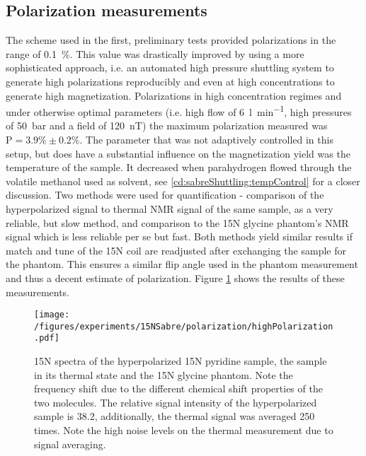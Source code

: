     \subsection{Polarization measurements}
    The scheme used in the first, preliminary tests provided polarizations in the range of \SI{0.1}{\percent}. This value was drastically improved by using a more sophisticated approach, i.e. an automated high pressure shuttling system to generate high polarizations reproducibly and even at high concentrations to generate high magnetization.
    Polarizations in high concentration regimes and under otherwise optimal parameters (i.e. high flow of \SI{6}{\litre\per\minute}, high pressures of \SI{50}{\bar} and a field of \SI{120}{\nano\tesla}) the maximum polarization measured was $\mathrm{P} = 3.9\% \pm 0.2 \%$. The parameter that was not adaptively controlled in this setup, but does have a substantial influence on the magnetization yield was the temperature of the sample.  It decreased when parahydrogen flowed through the volatile methanol used as solvent, see \ref{cd:sabreShuttling:tempControl} for a closer discussion.
    Two methods were used for quantification - comparison of the hyperpolarized signal to thermal NMR signal of the same sample, as a very reliable, but slow method, and comparison to the 15N glycine phantom's NMR signal which is less reliable per se but fast. Both methods yield similar results if match and tune of the 15N coil are readjusted after exchanging the sample for the phantom. This ensures a similar flip angle used in the phantom measurement and thus a decent estimate of polarization. Figure \ref{fig:results:15N:polarization} shows the results of these measurements.
        \begin{figure}
            \texttt{[image: /figures/experiments/15NSabre/polarization/highPolarization.pdf]}
            \caption[High 15N polarization]{15N spectra of the hyperpolarized 15N pyridine sample, the sample in its thermal state and the 15N glycine phantom. Note the frequency shift due to the different chemical shift properties of the two molecules. The relative signal intensity of the hyperpolarized sample is 38.2, additionally, the thermal signal was averaged 250 times. Note the high noise levels on the thermal measurement due to signal averaging.}
            \label{fig:results:15N:polarization}
        \end{figure}
